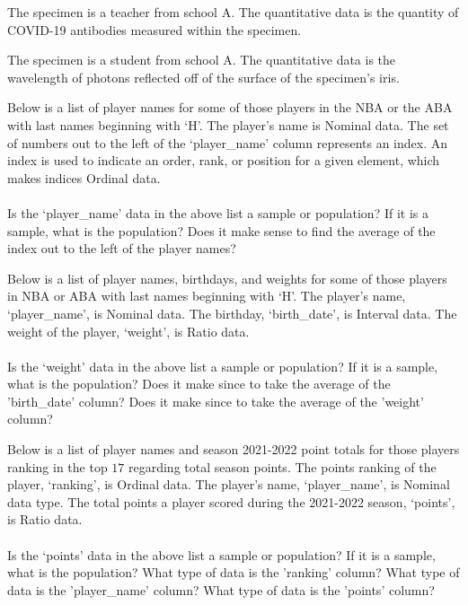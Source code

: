 \begin{example}
The specimen is a teacher from school A. The quantitative data is the quantity of COVID-19 antibodies measured within the specimen. 
\end{example}

\begin{example}
The specimen is a student from school A. The quantitative data is the wavelength of photons reflected off of the surface of the specimen's iris. 
\end{example}

\begin{dataset}
Below is a list of player names for some of those players in the NBA or the ABA with last names beginning with `H'. The player's name is Nominal data. The set of numbers out to the left of the `player\_name' column represents an index. An index is used to indicate an order, rank, or position for a given element, which makes indices Ordinal data. \\[1ex]
\\[2ex]
Is the `player\_name' data in the above list a sample or population? If it is a sample, what is the population? Does it make sense to find the average of the index out to the left of the player names?
\end{dataset}

\begin{dataset}
Below is a list of player names, birthdays, and weights for some of those players in NBA or ABA with last names beginning with `H'. The player's name, `player\_name', is Nominal data. The birthday, `birth\_date', is Interval data. The weight of the player, `weight', is Ratio data.\\[1ex]
\\[2ex]
Is the `weight' data in the above list a sample or population? If it is a sample, what is the population? Does it make since to take the average of the 'birth\_date' column? Does it make since to take the average of the 'weight' column?
\end{dataset}

\begin{dataset}
Below is a list of player names and season 2021-2022 point totals for those players ranking in the top $17$ regarding total season points. The points ranking of the player, `ranking', is Ordinal data. The player's name, `player\_name', is Nominal data type. The total points a player scored during the 2021-2022 season, `points', is Ratio data.\\[1ex]
\\[2ex]
Is the `points' data in the above list a sample or population? If it is a sample, what is the population? What type of data is the 'ranking' column? What type of data is the 'player\_name' column? What type of data is the 'points' column?
\end{dataset}